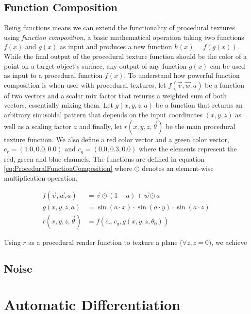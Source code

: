 \subsection{Function Composition}

Being functions means we can extend the functionality of procedural textures using \textit{function composition}, a basic mathematical operation taking two functions $f(x)$ and $g(x)$ as input and produces a new function $h(x) = f(g(x))$. While the final output of the procedural texture function should be the color of a point on a target object's surface, any output of any function $g(x)$ can be used as input to a procedural function $f(x)$. To understand how powerful function composition is when user with procedural textures, let $f(\vec{v}, \vec{w}, a)$ be a function of two vectors and a scalar mix factor that returns a weighted sum of both vectors, essentially mixing them. Let $g(x,y,z,a)$ be a function that returns an arbitrary sinusoidal pattern that depends on the input coordinates $(x,y,z)$ as well as a scaling factor $a$ and finally, let $r(x,y,z,\vec{\theta})$ be the main procedural texture function. We also define a red color vector and a green color vector, $c_r = (1.0,0.0,0.0)$ and $c_g = (0.0,0.3,0.0)$ where the elements represent the red, green and blue channels. The functions are defined in equation \ref{eq:ProceduralFunctionComposition} where $\odot$ denotes an element-wise multiplication operation.

\begin{equation}\label{eq:ProceduralFunctionComposition}
\begin{aligned}
    f(\vec{v}, \vec{w}, a) &= \vec{v} \odot (1 - a) + \vec{w} \odot a \\
    g(x,y,z,a) &= \sin(a \cdot x)\cdot \sin(a \cdot y)\cdot \sin(a \cdot z)  \\
    r(x,y,z,\vec{\theta}) &= f(c_r, c_g, g(x,y,z,\theta_0))
\end{aligned}
\end{equation}

Using $r$ as a procedural render function to texture a plane ($\forall z, z = 0$), we achieve 

\subsection{Noise}


\section{Automatic Differentiation}\label{sec:AutomaticDifferentiation}

